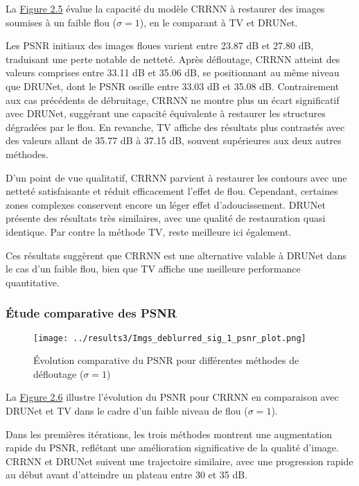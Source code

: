 \documentclass[a4paper, 12pt]{report} %
\begin{document}
La \hyperref[fig:16]{Figure 2.5} évalue la capacité du modèle CRRNN à restaurer des images soumises à un faible flou (\(\sigma = 1\)), en le comparant à TV et DRUNet.

Les PSNR initiaux des images floues varient entre 23.87 dB et 27.80 dB, traduisant une perte notable de netteté. Après défloutage, CRRNN atteint des valeurs comprises entre 33.11 dB et 35.06 dB, se positionnant au même niveau que DRUNet, dont le PSNR oscille entre 33.03 dB et 35.08 dB. Contrairement aux cas précédents de débruitage, CRRNN ne montre plus un écart significatif avec DRUNet, suggérant une capacité équivalente à restaurer les structures dégradées par le flou. En revanche, TV affiche des résultats plus contrastés avec des valeurs allant de 35.77 dB à 37.15 dB, souvent supérieures aux deux autres méthodes.

D’un point de vue qualitatif, CRRNN parvient à restaurer les contours avec une netteté satisfaisante et réduit efficacement l’effet de flou. Cependant, certaines zones complexes conservent encore un léger effet d’adoucissement. DRUNet présente des résultats très similaires, avec une qualité de restauration quasi identique. Par contre la méthode TV, reste meilleure ici également. 

Ces résultats suggèrent que CRRNN est une alternative valable à DRUNet dans le cas d’un faible flou, bien que TV affiche une meilleure performance quantitative.

\subsubsection{Étude comparative des PSNR}

\begin{figure}[H]
\centering
\begin{adjustbox}{width=0.985\linewidth, totalheight=0.47 \textheight, angle=0, scale=0.9, minipage=4.2\linewidth, margin=0}
    \texttt{[image: ../results3/Imgs\_deblurred\_sig\_1\_psnr\_plot.png]}
\end{adjustbox}
    \caption{Évolution comparative du PSNR pour différentes méthodes de défloutage (\(\sigma = 1\))}
    \label{fig:17}
\end{figure}

La \hyperref[fig:17]{Figure 2.6} illustre l’évolution du PSNR pour CRRNN en comparaison avec DRUNet et TV dans le cadre d’un faible niveau de flou (\(\sigma = 1\)).

Dans les premières itérations, les trois méthodes montrent une augmentation rapide du PSNR, reflétant une amélioration significative de la qualité d’image. CRRNN et DRUNet suivent une trajectoire similaire, avec une progression rapide au début avant d’atteindre un plateau entre 30 et 35 dB.
\end{document}
